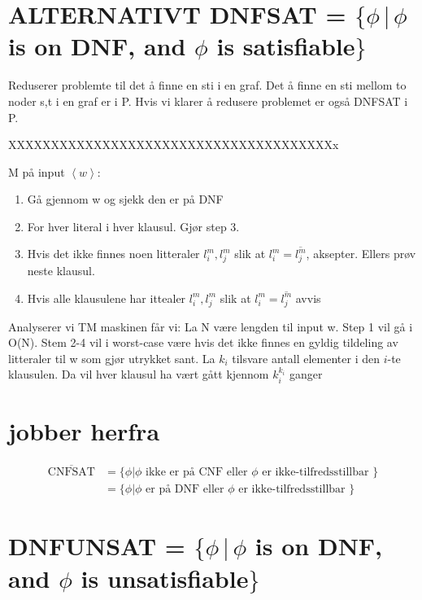 \documentclass{article}
\begin{document}
\newpage

\section{ALTERNATIVT \quad DNFSAT = $\{\phi \, |  \, \phi $ is on DNF, and $\phi$ is satisfiable$\}$}

Reduserer problemte til det å finne en sti i en graf. Det å finne en sti mellom to noder s,t i en graf er i P. Hvis vi klarer å redusere problemet er også DNFSAT i P.




XXXXXXXXXXXXXXXXXXXXXXXXXXXXXXXXXXXXXXx

M på input $\left< w \right>$:
\begin{enumerate}
\item Gå gjennom w og sjekk den er på DNF
\item For hver literal i hver klausul. Gjør step 3.
\item Hvis det ikke finnes noen litteraler $l_i^m, l_j^m$ slik at $l_i^m = \overline{l_j^m}$, aksepter. Ellers prøv neste klausul.
\item Hvis alle klausulene har ittealer $l_i^m, l_j^m$ slik at $l_i^m = \overline{l_j^m}$ avvis
\end{enumerate}

Analyserer vi TM maskinen får vi: La N være lengden til input w. Step 1 vil gå i O(N). Stem 2-4 vil i worst-case være hvis det ikke finnes en gyldig tildeling av litteraler til w som gjør utrykket sant. La $k_i$ tilsvare antall elementer i den $i$-te klausulen. Da vil hver klausul ha vært gått kjennom $k_i^{k_i}$ ganger




\section{jobber herfra}

\begin{align*}\overline{\text{CNFSAT}} &= \{\phi | \phi \text{ ikke er på CNF eller } \phi \text{ er ikke-tilfredsstillbar } \} \\ &= \{\phi | \phi \text{ er på DNF eller }\phi \text{ er ikke-tilfredsstillbar }\}\end{align*}



 




\section{DNFUNSAT = $\{\phi \, |  \, \phi $ is on DNF, and $\phi$ is unsatisfiable$\}$}
\end{document}
